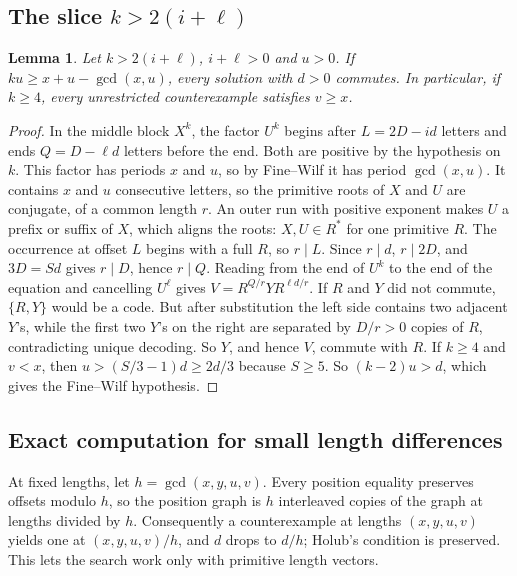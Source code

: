 \documentclass[11pt]{article}
\newtheorem{lemma}[theorem]{Lemma}
\theoremstyle{remark}\newtheorem*{remark}{Remark}
\begin{document}
\subsection{The slice \(k>2(i+\ell)\)}
\begin{lemma}\label{middle}
Let \(k>2(i+\ell)\), \(i+\ell>0\) and \(u>0\). If \(ku\ge x+u-\gcd(x,u)\), every solution with \(d>0\) commutes. In particular, if \(k\ge4\), every unrestricted counterexample satisfies \(v\ge x\).
\end{lemma}
\begin{proof}
In the middle block \(X^k\), the factor \(U^k\) begins after \(L=2D-id\) letters and ends \(Q=D-\ell d\) letters before the end. Both are positive by the hypothesis on \(k\). This factor has periods \(x\) and \(u\), so by Fine--Wilf it has period \(\gcd(x,u)\). It contains \(x\) and \(u\) consecutive letters, so the primitive roots of \(X\) and \(U\) are conjugate, of a common length \(r\). An outer run with positive exponent makes \(U\) a prefix or suffix of \(X\), which aligns the roots: \(X,U\in R^*\) for one primitive \(R\). The occurrence at offset \(L\) begins with a full \(R\), so \(r\mid L\). Since \(r\mid d\), \(r\mid 2D\), and \(3D=Sd\) gives \(r\mid D\), hence \(r\mid Q\). Reading from the end of \(U^k\) to the end of the equation and cancelling \(U^\ell\) gives \(V=R^{Q/r}YR^{\ell d/r}\). If \(R\) and \(Y\) did not commute, \(\{R,Y\}\) would be a code. But after substitution the left side contains two adjacent \(Y\)'s, while the first two \(Y\)'s on the right are separated by \(D/r>0\) copies of \(R\), contradicting unique decoding. So \(Y\), and hence \(V\), commute with \(R\).
If \(k\ge4\) and \(v<x\), then \(u>(S/3-1)d\ge 2d/3\) because \(S\ge5\). So \((k-2)u>d\), which gives the Fine--Wilf hypothesis.
\end{proof}

\subsection{Exact computation for small length differences}
At fixed lengths, let \(h=\gcd(x,y,u,v)\). Every position equality preserves offsets modulo \(h\), so the position graph is \(h\) interleaved copies of the graph at lengths divided by \(h\). Consequently a counterexample at lengths \((x,y,u,v)\) yields one at \((x,y,u,v)/h\), and \(d\) drops to \(d/h\); Holub's condition is preserved. This lets the search work only with primitive length vectors.
\end{document}
